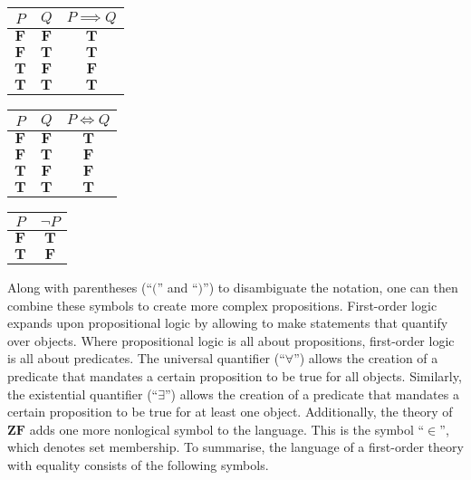\documentclass[../main.tex]{subfiles}
\begin{document}
\begin{table}[!hbp]
    \begin{minipage}{.5\linewidth}
        \centering
        \begin{tabular}{c|c||c}
            $P$ & $Q$ & $P\implies Q$ \\
            \hline
            $\mathbf{F}$ & $\mathbf{F}$ & $\mathbf{T}$ \\
            $\mathbf{F}$ & $\mathbf{T}$ & $\mathbf{T}$ \\
            $\mathbf{T}$ & $\mathbf{F}$ & $\mathbf{F}$ \\
            $\mathbf{T}$ & $\mathbf{T}$ & $\mathbf{T}$
        \end{tabular}
        \label{tab:first_order_logic:logical_implication}
    \end{minipage}%
    \begin{minipage}{.5\linewidth}
        \centering
        \begin{tabular}{c|c||c}
            $P$ & $Q$ & $P\iff Q$ \\
            \hline
            $\mathbf{F}$ & $\mathbf{F}$ & $\mathbf{T}$ \\
            $\mathbf{F}$ & $\mathbf{T}$ & $\mathbf{F}$ \\
            $\mathbf{T}$ & $\mathbf{F}$ & $\mathbf{F}$ \\
            $\mathbf{T}$ & $\mathbf{T}$ & $\mathbf{T}$
        \end{tabular}
        \label{tab:first_order_logic:logical_biconditional}
    \end{minipage}

    \begin{center}
        \begin{tabular}{c||c}
            $P$ & $\lnot P$ \\
            \hline
            $\mathbf{F}$ & $\mathbf{T}$ \\
            $\mathbf{T}$ & $\mathbf{F}$
        \end{tabular}
        \label{tab:first_order_logic:logical_negation}
    \end{center}
\end{table}
Along with parentheses (``$($'' and ``$)$'') to disambiguate the notation, one can then combine these symbols to create more complex propositions. First-order logic expands upon propositional logic by allowing to make statements that quantify over objects. Where propositional logic is all about propositions, first-order logic is all about predicates. The universal quantifier (``$\forall$'') allows the creation of a predicate that mandates a certain proposition to be true for all objects. Similarly, the existential quantifier (``$\exists$'') allows the creation of a predicate that mandates a certain proposition to be true for at least one object. Additionally, the theory of $\mathbf{ZF}$ adds one more nonlogical symbol to the language. This is the symbol ``$\in$'', which denotes set membership. To summarise, the language of a first-order theory with equality consists of the following symbols.
\end{document}
